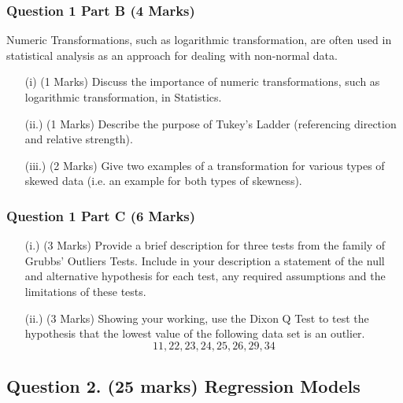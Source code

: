\documentclass[a4paper,12pt]{article}
\begin{document}
\newpage
\subsubsection*{Question 1 Part B (4 Marks)}
Numeric Transformations, such as logarithmic transformation, are often used in statistical analysis as an approach for dealing with non-normal data.
\begin{itemize}
	\item[(i)] (1 Marks) Discuss the importance of numeric transformations, such as logarithmic transformation, in Statistics.
	\item[(ii.)] (1 Marks) Describe the purpose of Tukey's Ladder (referencing direction and relative strength).
	\item[(iii.)] (2 Marks) Give two examples of a transformation for various types of skewed data (i.e. an example for both types of skewness).
\end{itemize}

\subsubsection*{Question 1 Part C (6 Marks)}

\begin{itemize}
	\item[(i.)] (3 Marks) Provide a brief description for three tests from the family of Grubbs'  Outliers Tests. Include in your description a statement of the null and alternative hypothesis for each test, any required assumptions and the limitations of these tests.
	\item[(ii.)] (3 Marks) Showing your working, use the Dixon Q Test to test the hypothesis that the lowest value of the following data set is an outlier.
	\[ 11,22,23,24,25,26,29,34\]
\end{itemize}	


\newpage




\subsection*{Question 2. (25 marks) Regression Models }
\end{document}
